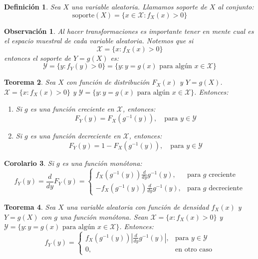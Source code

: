 \documentclass[14pt]{extarticle}
\newtheorem{theorem}{Teorema}[section]
\newtheorem{corollary}[theorem]{Corolario}
\newtheorem{definition}[theorem]{Definición}
\newtheorem{remark}{Observación}[section]
\begin{document}
\begin{definition}
    Sea $X$ una variable aleatoria. Llamamos soporte de $X$ al conjunto:
    \[
        \text{soporte}(X) = \{x \in \mathcal{X}: f_X(x) > 0\}
    \]
\end{definition}

\begin{remark}
    Al hacer transformaciones es importante tener en mente cual es el espacio muestral de cada variable aleatoria. Notemos que  si 
    \[
        \mathcal{X} = \{x: f_X(x) > 0\}
    \]
    entonces el soporte de $Y = g(X)$ es:
    \[
        \mathcal{Y} = \{y: f_Y(y) > 0\} = \{y: y = g(x) \text{ para algún } x \in \mathcal{X}\}
    \]
\end{remark}

\begin{theorem}
    Sea $X$ con función de distribución $F_X(x)$ y $Y = g(X)$. $\mathcal{X}=\{x: f_X(x) > 0\}$ y $\mathcal{Y}=\{y: y = g(x) \text{ para algún } x \in \mathcal{X}\}$.
    Entonces:
    \begin{enumerate}
        \item Si $g$ es una función creciente en $\mathcal{X}$, entonces:
        \[
            F_Y(y) = F_X(g^{-1}(y)), \quad \text{para } y \in \mathcal{Y}
        \]
        \item Si $g$ es una función decreciente en $\mathcal{X}$, entonces:
        \[
            F_Y(y) = 1 - F_X(g^{-1}(y)), \quad \text{para } y \in \mathcal{Y}
        \]
    \end{enumerate}
\end{theorem}

\begin{corollary}
    Si $g$ es una función monótona:
    \[
        f_Y(y) = \frac{d}{dy} F_Y(y) = \begin{cases}
            f_X(g^{-1}(y))\frac{d}{dy} g^{-1}(y), & \text{para } g \text{ creciente}\\
            -f_X(g^{-1}(y))\frac{d}{dy} g^{-1}(y), & \text{para } g \text{ decreciente}
        \end{cases} 
    \]
\end{corollary}

\begin{theorem}
    Sea $X$ una variable aleatoria con función de densidad $f_X(x)$ y $Y = g(X)$ con $g$ una función monótona. Sean $\mathcal{X}=\{x: f_X(x) > 0\}$ y $\mathcal{Y}=\{y: y = g(x) \text{ para algún } x \in \mathcal{X}\}$.
    Entonces:
    \[
        f_Y(y) = \begin{cases}
            f_X(g^{-1}(y)) \left| \frac{d}{dy} g^{-1}(y) \right|, & \text{para } y \in \mathcal{Y}\\
            0, & \text{en otro caso}
        \end{cases} 
    \]
\end{theorem}
\end{document}
